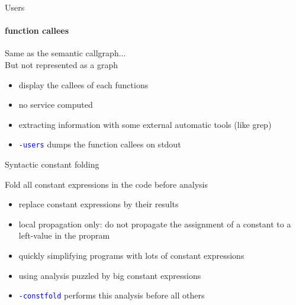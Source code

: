 \documentclass{beamer}
\newcommand{\orange}[1]{{\textcolor{frama-c-1}{#1}}}
\newcommand{\vvert}[1]{{\textcolor{vert}{#1}}}
\newcommand{\bleu}[1]{{\textcolor{blue}{#1}}}
\newcommand{\goup}{\vspace{-5pt}}
\newcommand{\code}[1]{\bleu{\texttt{#1}}}
\newcommand{\intro}[1]{\begin{center}\vvert{#1}\end{center}}
\newenvironment{sect}[1]{\orange{#1}\begin{itemize}}{\end{itemize}}
\newenvironment{whatitisgoodfor}{\begin{sect}{What is it good for}}{\end{sect}}
\newenvironment{howtouse}{\begin{sect}{How to use}}{\end{sect}}
\begin{document}
\begin{frame}{Users}
\framesubtitle{function callees}

\goup
\intro{Same as the semantic callgraph... \\
  But not represented as a graph}
\goup

\begin{sect}{Feature}
\item display the callees of each functions
\end{sect}\smallskip

\begin{sect}{Warning}
\item no service computed
\end{sect}\smallskip

\begin{whatitisgoodfor}
\item extracting information with some external automatic tools (like grep)
\end{whatitisgoodfor}\smallskip

\begin{howtouse}
\item \code{-users} dumps the function callees on stdout
\end{howtouse}

\end{frame}


\begin{frame}{Syntactic constant folding}

\goup
\intro{Fold all constant expressions in the code before analysis}
\goup

\begin{sect}{Feature}
\item replace constant expressions by their results
\end{sect}\smallskip

\begin{sect}{Warning}
\item local propagation only: do not propagate the assignment of a constant to
  a left-value in the propram
\end{sect}\smallskip

\begin{whatitisgoodfor}
\item quickly simplifying programs with lots of constant expressions
\item using analysis puzzled by big constant expressions
\end{whatitisgoodfor}\smallskip

\begin{howtouse}
\item \code{-constfold} performs this analysis before all others
\end{howtouse}

\end{frame}
\end{document}
